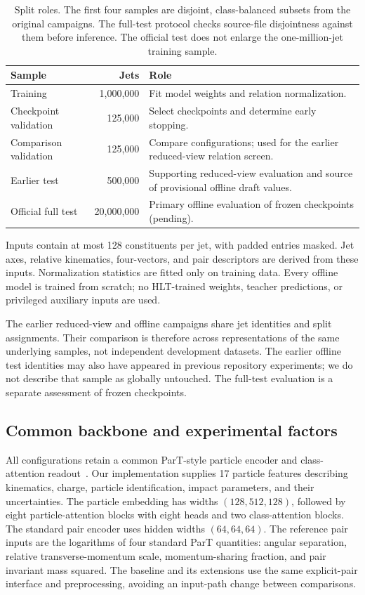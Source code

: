 \begin{table}[htbp]
\centering
\small
\begin{tabularx}{\linewidth}{@{}lrX@{}}
\toprule
Sample & Jets & Role \\
\midrule
Training & 1,000,000 & Fit model weights and relation normalization. \\
Checkpoint validation & 125,000 & Select checkpoints and determine early stopping. \\
Comparison validation & 125,000 & Compare configurations; used for the earlier reduced-view relation screen. \\
Earlier test & 500,000 & Supporting reduced-view evaluation and source of provisional offline draft values. \\
Official full test & 20,000,000 & Primary offline evaluation of frozen checkpoints (pending). \\
\bottomrule
\end{tabularx}
\caption{Split roles. The first four samples are disjoint, class-balanced
subsets from the original campaigns. The full-test protocol checks
source-file disjointness against them before inference. The official test
does not enlarge the one-million-jet training sample.}
\label{tab:experimental-splits}
\end{table}

Inputs contain at most 128 constituents per jet, with padded entries
masked. Jet axes, relative kinematics, four-vectors, and pair descriptors
are derived from these inputs. Normalization statistics are fitted only
on training data. Every offline model is trained from scratch; no
HLT-trained weights, teacher predictions, or privileged auxiliary inputs
are used.

The earlier reduced-view and offline campaigns share jet identities and
split assignments. Their comparison is therefore across representations
of the same underlying samples, not independent development datasets.
The earlier offline test identities may also have appeared in previous
repository experiments; we do not describe that sample as globally
untouched. The full-test evaluation is a separate assessment of frozen
checkpoints.

\subsection{Common backbone and experimental factors}
\label{sec:experimental-models}

All configurations retain a common ParT-style particle encoder and
class-attention readout~\cite{Qu:2022mxj}. Our implementation supplies 17
particle features describing kinematics, charge, particle identification,
impact parameters, and their uncertainties. The particle embedding has
widths $(128,512,128)$, followed by eight particle-attention blocks with
eight heads and two class-attention blocks. The standard pair encoder uses
hidden widths $(64,64,64)$. The reference pair inputs are the logarithms of
four standard ParT quantities: angular separation, relative transverse-momentum
scale, momentum-sharing fraction, and pair invariant mass squared. The
baseline and its extensions use the same explicit-pair interface and
preprocessing, avoiding an input-path change between comparisons.

